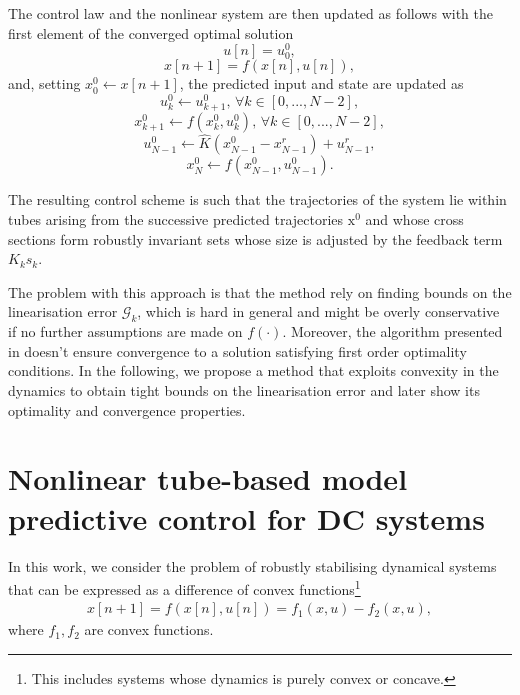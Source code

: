 \documentclass[letterpaper, 10 pt, conference]{ieeeconf}
\begin{document}
The control law and the nonlinear system are then updated as follows with the first element of the converged optimal solution
%
\begin{equation}
\label{eq:step_update1}   
u[n] = u^0_{0}, 
\end{equation}
\begin{equation}
\label{eq:step_update2}   
x[n+1] = f(x[n], u[n]),
\end{equation}
%
and, setting $x^0_0 \longleftarrow  x[n+1]$,  the predicted input and state are updated as
\begin{equation}
\label{eq:step_update3}
u^0_{k} \longleftarrow u^0_{k+1}, \, \forall k \in [0, ..., N-2], 
\end{equation}
\begin{equation}
\label{eq:step_update4}
x^0_{k+1} \longleftarrow  f(x^0_{k}, u^0_{k}), \, \forall k \in [0, ..., N-2],
\end{equation}
\begin{equation}
\label{eq:step_update5_}
 u^0_{N-1} \longleftarrow \hat{K}(x^0_{N-1} - x^r_{N-1}) + u^r_{N-1},
\end{equation}
\begin{equation}
\label{eq:step_update5}
x^0_{N} \longleftarrow  f(x^0_{N-1}, u^0_{N-1}).
\end{equation}

The resulting control scheme is such that the trajectories of the system lie within tubes arising from the successive predicted trajectories $\bm{\mathrm{x}}^0$ and whose cross sections form robustly invariant sets whose size is adjusted by the feedback term $K_k s_k$. 

The problem with this approach is that the method rely on finding bounds on the linearisation error $\mathcal{G}_k$, which is hard in general and might be overly conservative if no further assumptions are made on $f(\cdot)$. Moreover, the algorithm presented in \cite{mark} doesn't ensure convergence to a solution satisfying first order optimality conditions. In the following, we propose a method that exploits convexity in the dynamics to obtain tight bounds on the linearisation error and later show its optimality and convergence properties. 


\section{Nonlinear tube-based model predictive control for DC systems}
\label{sec:theory}

In this work, we consider the problem of robustly stabilising dynamical systems that can be expressed as a difference of convex functions\footnote{This includes systems whose dynamics is purely convex or concave.} 
%
\begin{align}
\label{eq:DC}
x[n+1] = f(x[n], u[n])=  f_1(x, u) -  f_2(x, u), 
\end{align}
where $f_1, f_2$ are convex functions.
\end{document}
